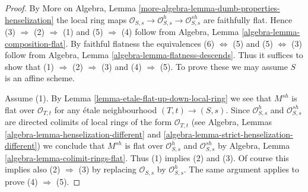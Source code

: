 \documentclass[10pt,a4paper]{amsart}
\theoremstyle{plain}
\theoremstyle{definition}
\theoremstyle{remark}
\numberwithin{equation}{subsection}
\begin{document}
\begin{proof}
By More on Algebra, Lemma
\ref{more-algebra-lemma-dumb-properties-henselization}
the local ring maps
$\mathcal{O}_{S, s} \to \mathcal{O}_{S, s}^h \to \mathcal{O}_{S, s}^{sh}$
are faithfully flat.
Hence (3) $\Rightarrow$ (2) $\Rightarrow$ (1) and
(5) $\Rightarrow$ (4) follow from
Algebra, Lemma \ref{algebra-lemma-composition-flat}.
By faithful flatness the equivalences (6) $\Leftrightarrow$ (5) and
(5) $\Leftrightarrow$ (3) follow from
Algebra, Lemma \ref{algebra-lemma-flatness-descends}.
Thus it suffices to show that
(1) $\Rightarrow$ (2) $\Rightarrow$ (3) and
(4) $\Rightarrow$ (5).
To prove these we may assume $S$ is an affine scheme.

\medskip\noindent
Assume (1). By
Lemma \ref{lemma-etale-flat-up-down-local-ring}
we see that $M^{sh}$ is flat over $\mathcal{O}_{T, t}$ for
any \'etale neighbourhood $(T, t) \to (S, s)$. Since $\mathcal{O}_{S, s}^h$
and $\mathcal{O}_{S, s}^{sh}$ are directed colimits of local rings
of the form $\mathcal{O}_{T, t}$ (see
Algebra, Lemmas \ref{algebra-lemma-henselization-different}
and \ref{algebra-lemma-strict-henselization-different})
we conclude that $M^{sh}$ is flat over $\mathcal{O}_{S, s}^h$
and $\mathcal{O}_{S, s}^{sh}$ by
Algebra, Lemma \ref{algebra-lemma-colimit-rings-flat}.
Thus (1) implies (2) and (3). Of course this implies also
(2) $\Rightarrow$ (3) by replacing $\mathcal{O}_{S, s}$ by
$\mathcal{O}_{S, s}^h$. The same argument applies to prove
(4) $\Rightarrow$ (5).
\end{proof}
\end{document}
